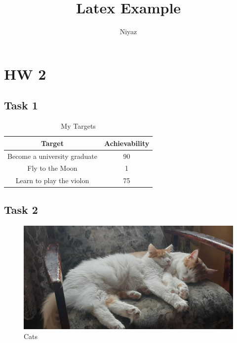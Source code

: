 \documentclass{article}
\title{Latex Example}
\author{Niyaz}
\begin{document}
\maketitle

\section{HW 2}

\subsection{Task 1}

\begin{table}[ht!]
\centering
\begin{tabular}{c|c}
\\\hline
Target&Achievability\\\hline
Become a university graduate&90\\
Fly to the Moon&1\\
Learn to play the violon&75
\end{tabular}
\caption{My Targets}
\end{table}

\subsection{Task 2}

\begin{figure}[ht!]
\centering
\includegraphics[width=0.8\linewidth]{data/image.png}
\caption{Cats}
\end{figure}
\end{document}
